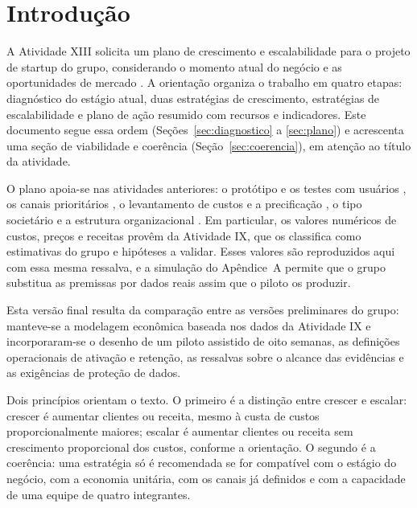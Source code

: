 \section{Introdução}
\label{sec:introducao}

A Atividade XIII solicita um plano de crescimento e escalabilidade para o projeto de startup do grupo, considerando o momento atual do negócio e as oportunidades de mercado \cite{pucminas2026xiii}. A orientação organiza o trabalho em quatro etapas: diagnóstico do estágio atual, duas estratégias de crescimento, estratégias de escalabilidade e plano de ação resumido com recursos e indicadores. Este documento segue essa ordem (Seções~\ref{sec:diagnostico} a \ref{sec:plano}) e acrescenta uma seção de viabilidade e coerência (Seção~\ref{sec:coerencia}), em atenção ao título da atividade.

O plano apoia-se nas atividades anteriores: o protótipo e os testes com usuários \cite{grupo2026a6}, os canais prioritários \cite{grupo2026a8}, o levantamento de custos e a precificação \cite{grupo2026a9}, o tipo societário \cite{grupo2026a10} e a estrutura organizacional \cite{grupo2026a11}. Em particular, os valores numéricos de custos, preços e receitas provêm da Atividade IX, que os classifica como estimativas do grupo e hipóteses a validar. Esses valores são reproduzidos aqui com essa mesma ressalva, e a simulação do Apêndice~A permite que o grupo substitua as premissas por dados reais assim que o piloto os produzir.

Esta versão final resulta da comparação entre as versões preliminares do grupo: manteve-se a modelagem econômica baseada nos dados da Atividade IX e incorporaram-se o desenho de um piloto assistido de oito semanas, as definições operacionais de ativação e retenção, as ressalvas sobre o alcance das evidências e as exigências de proteção de dados.

Dois princípios orientam o texto. O primeiro é a distinção entre crescer e escalar: crescer é aumentar clientes ou receita, mesmo à custa de custos proporcionalmente maiores; escalar é aumentar clientes ou receita sem crescimento proporcional dos custos, conforme a orientação. O segundo é a coerência: uma estratégia só é recomendada se for compatível com o estágio do negócio, com a economia unitária, com os canais já definidos e com a capacidade de uma equipe de quatro integrantes.
